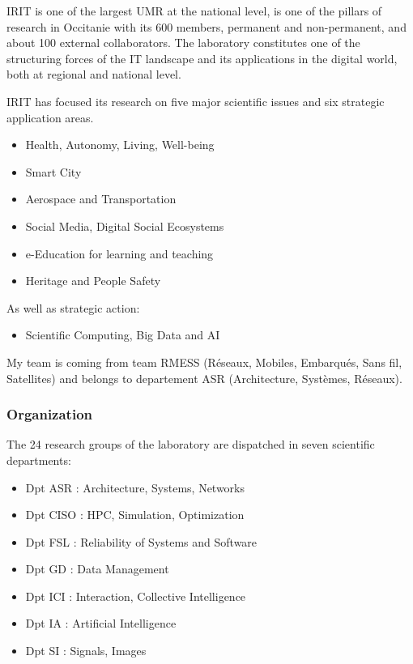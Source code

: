 \documentclass[
  a4paper, xcolor = usenames,dvipsnames]{article}
\providecommand{\tightlist}{%
  \setlength{\itemsep}{0pt}\setlength{\parskip}{0pt}}
\theoremstyle{definition}
\theoremstyle{definition}
\theoremstyle{definition}
\theoremstyle{definition}
\theoremstyle{remark}
\begin{document}
IRIT is one of the largest UMR at the national level, is one of the pillars of research in Occitanie with its 600 members, permanent and non-permanent, and about 100 external collaborators. The laboratory constitutes one of the structuring forces of the IT landscape and its applications in the digital world, both at regional and national level.

IRIT has focused its research on five major scientific issues and six strategic application areas.

\begin{itemize}
\tightlist
\item
  Health, Autonomy, Living, Well-being
\item
  Smart City
\item
  Aerospace and Transportation
\item
  Social Media, Digital Social Ecosystems
\item
  e-Education for learning and teaching
\item
  Heritage and People Safety
\end{itemize}

As well as strategic action:

\begin{itemize}
\tightlist
\item
  Scientific Computing, Big Data and AI
\end{itemize}

My team is coming from team RMESS (Réseaux, Mobiles, Embarqués, Sans fil, Satellites) and belongs to departement ASR (Architecture, Systèmes, Réseaux).

\hypertarget{organization}{%
\subsubsection{Organization}\label{organization}}

The 24 research groups of the laboratory are dispatched in seven scientific departments:

\begin{itemize}
\tightlist
\item
  Dpt ASR : Architecture, Systems, Networks
\item
  Dpt CISO : HPC, Simulation, Optimization
\item
  Dpt FSL : Reliability of Systems and Software
\item
  Dpt GD : Data Management
\item
  Dpt ICI : Interaction, Collective Intelligence
\item
  Dpt IA : Artificial Intelligence
\item
  Dpt SI : Signals, Images
\end{itemize}
\end{document}
